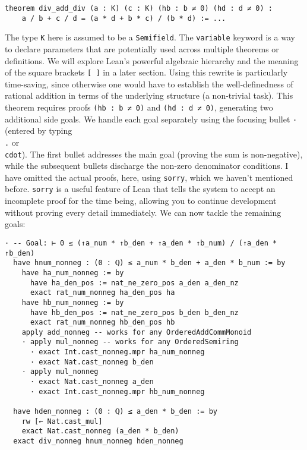 \begin{example}
\begin{lstlisting}[language=lean]
theorem div_add_div (a : K) (c : K) (hb : b ≠ 0) (hd : d ≠ 0) :
    a / b + c / d = (a * d + b * c) / (b * d) := ...
\end{lstlisting}
  The type \lstinline[language=lean]|K| here is assumed to be a
  \lstinline[language=lean]|Semifield|. The \lstinline[language=lean]|variable|
  keyword is a way to declare parameters that are potentially used across
  multiple theorems or definitions. We will explore Lean's powerful algebraic
  hierarchy and the meaning of the square brackets \lstinline[language=lean]|[ ]|
  in a later section.
  Using this rewrite is particularly time-saving, since otherwise one would have to
  establish the well-definedness of rational addition in terms of the underlying
  structure (a non-trivial task).
  This theorem requires proofs \lstinline[language=lean]|(hb : b ≠ 0)| and
  \lstinline[language=lean]|(hd : d ≠ 0)|, generating two additional side goals.
  We handle each goal separately using the focusing bullet \lstinline[language=lean]|·|
  (entered by typing \texttt{\\.} or \texttt{\\cdot}).
  The first bullet addresses the main goal (proving the sum is non-negative),
  while the subsequent bullets discharge the non-zero denominator conditions.
  I have omitted the actual proofs, here, using \lstinline[language=lean]|sorry|,
  which we haven't mentioned before. \lstinline[language=lean]|sorry| is a useful
  feature of Lean that tells the system to accept an incomplete proof for the time being,
  allowing you to continue development without proving every detail immediately.
  We can now tackle the remaining goals:
  \newpage
  \begin{lstlisting}[language=lean]
· -- Goal: ⊢ 0 ≤ (↑a_num * ↑b_den + ↑a_den * ↑b_num) / (↑a_den * ↑b_den)
  have hnum_nonneg : (0 : ℚ) ≤ a_num * b_den + a_den * b_num := by
    have ha_num_nonneg := by
      have ha_den_pos := nat_ne_zero_pos a_den a_den_nz
      exact rat_num_nonneg ha_den_pos ha
    have hb_num_nonneg := by
      have hb_den_pos := nat_ne_zero_pos b_den b_den_nz
      exact rat_num_nonneg hb_den_pos hb
    apply add_nonneg -- works for any OrderedAddCommMonoid
    · apply mul_nonneg -- works for any OrderedSemiring
      · exact Int.cast_nonneg.mpr ha_num_nonneg
      · exact Nat.cast_nonneg b_den
    · apply mul_nonneg
      · exact Nat.cast_nonneg a_den
      · exact Int.cast_nonneg.mpr hb_num_nonneg

  have hden_nonneg : (0 : ℚ) ≤ a_den * b_den := by
    rw [← Nat.cast_mul]
    exact Nat.cast_nonneg (a_den * b_den)
  exact div_nonneg hnum_nonneg hden_nonneg


\end{lstlisting}
\end{example}
